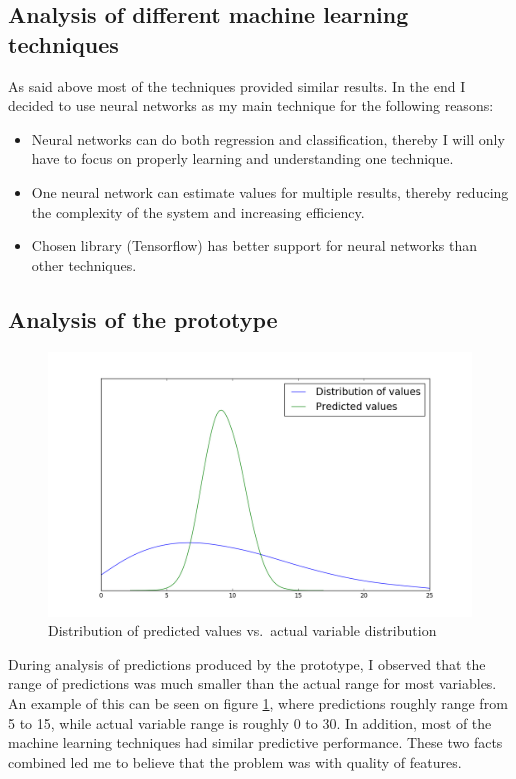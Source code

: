 \documentclass[12pt,a4paper]{book}
\begin{document}
\subsection{Analysis of different machine learning techniques}
As said above most of the techniques provided similar results.
In the end I decided to use neural networks as my main technique for the following reasons:
\begin{itemize}
\item Neural networks can do both regression and classification, thereby I will only have to focus on properly learning and understanding one technique.
\item One neural network can estimate values for multiple results, thereby reducing the complexity of the system and increasing efficiency.
\item Chosen library (Tensorflow) has better support for neural networks than other techniques.
\end{itemize}

\subsection{Analysis of the prototype}
\begin{figure}[ht]
\centering
\includegraphics[scale=0.5]{predicted_assists}
\caption{Distribution of predicted values vs.\ actual variable distribution}
\label{fig:variablerange}
\end{figure}
During analysis of predictions produced by the prototype, I observed that the range of predictions was much smaller than the actual range for most variables.
An example of this can be seen on figure \ref{fig:variablerange}, where predictions roughly range from 5 to 15, while actual variable range is roughly 0 to 30.
In addition, most of the machine learning techniques had similar predictive performance.
These two facts combined led me to believe that the problem was with quality of features.
\end{document}
